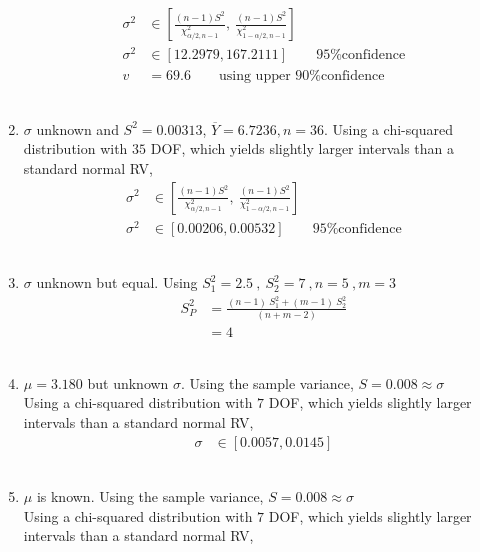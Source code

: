 \begin{enumerate}
		\begin{align}
			\sigma^2 &\in \left[\frac{(n-1)S^2}{\chi^2_{\alpha/2, n-1}} ,\  \frac{(n-1)S^2}{\chi^2_{1 -\alpha/2, n-1}} \right] \nonumber \\
			\sigma^2 &\in \left[ 12.2979, 167.2111 \right] \qquad \text{95\% confidence} \nonumber \\
			v &= 69.6 \qquad \text{using upper 90\% confidence}
		\end{align}\\
	
	
	\item  $ \sigma $ unknown and $ S^2 = 0.00313 $, $ \overline{Y} = 6.7236, n = 36$. Using a chi-squared distribution with $ 35 $ DOF, which yields slightly larger intervals than a standard normal RV,\\
	
		\begin{align}
			\sigma^2 &\in \left[\frac{(n-1)S^2}{\chi^2_{\alpha/2, n-1}} ,\  \frac{(n-1)S^2}{\chi^2_{1 -\alpha/2, n-1}} \right] \nonumber \\
			\sigma^2 &\in \left[ 0.00206, 0.00532 \right] \qquad \text{95\% confidence} 
		\end{align}\\
	
	
	\item  $ \sigma $ unknown but equal. Using $ S_1^2 = 2.5\ ,\ S_2^2 = 7\ , n = 5\ , m = 3 $\\
	
		\begin{align}
			S_P^2 &= \frac{(n-1)\ S_1^2 + (m-1)\ S_2^2}{(n+m-2)} \nonumber \\
			&= 4
		\end{align}\\
	
	
	\item  $ \mu = 3.180 $ but unknown $ \sigma $. Using the sample variance, $ S = 0.008 \approx \sigma $\\
	Using a chi-squared distribution with $ 7 $ DOF, which yields slightly larger intervals than a standard normal RV,\\
	
	
		\begin{align}
			\sigma &\in [0.0057, 0.0145]
		\end{align}\\
	
	
	\item  $ \mu $ is known. Using the sample variance, $ S = 0.008 \approx \sigma $\\
	Using a chi-squared distribution with $ 7 $ DOF, which yields slightly larger intervals than a standard normal RV,\\
	

\end{enumerate}
